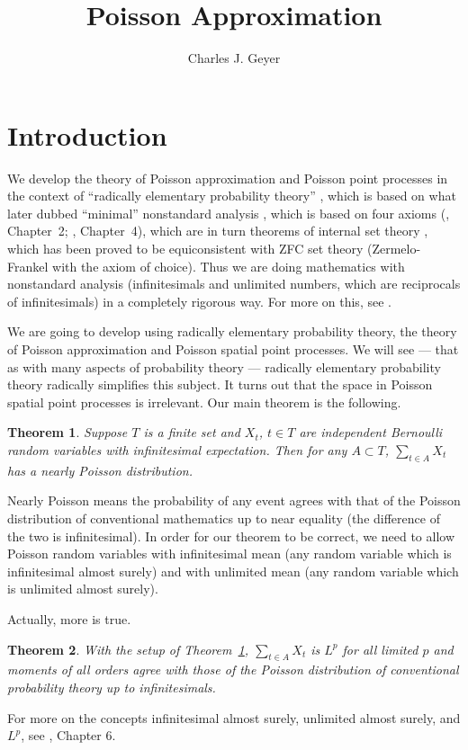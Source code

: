 \documentclass[11pt]{article}
\newtheorem{theorem}{Theorem}
\begin{document}
\title{Poisson Approximation}

\author{Charles J. Geyer}

\maketitle

\section{Introduction}

We develop the theory of Poisson approximation and Poisson point processes
in the context of ``radically elementary probability theory'' \citep{nelson},
which is based on what \citeauthor{nelson} later dubbed ``minimal'' nonstandard
analysis \citep{nelson-minimal}, which is based on four axioms
(\citealp{geyer}, Chapter~2; \citet{nelson}, Chapter~4), which are in turn
theorems of internal set theory \citep{nelson-bull}, which has been proved
to be equiconsistent with ZFC set theory (Zermelo-Frankel with the axiom of
choice).  Thus we are doing mathematics with nonstandard analysis
(infinitesimals and unlimited numbers, which are reciprocals of infinitesimals)
in a completely rigorous way.  For more on this, see \citet[Chapter~2]{geyer}.

We are going to develop using radically elementary probability theory,
the theory of Poisson approximation and Poisson spatial point processes.
We will see --- that as with many aspects of probability theory --- radically
elementary probability theory radically simplifies this subject.  It turns
out that the space in Poisson spatial point processes is irrelevant.
Our main theorem is the following.
\begin{theorem} \label{th:main}
Suppose $T$ is a finite set and $X_t$, $t \in T$ are independent Bernoulli
random variables with infinitesimal expectation.  Then for any $A \subset T$,
$\sum_{t \in A} X_t$ has a nearly Poisson distribution.
\end{theorem}
Nearly Poisson means the probability of any event agrees with that of the
Poisson distribution of conventional mathematics up to near equality
(the difference of the two is infinitesimal).  In order for our theorem
to be correct, we need to allow Poisson random variables with infinitesimal
mean (any random variable which is infinitesimal almost surely) and with
unlimited mean (any random variable which is unlimited almost surely).

Actually, more is true.
\begin{theorem} \label{th:l-p}
With the setup of Theorem~\ref{th:main},
$\sum_{t \in A} X_t$ is $L^p$ for all limited $p$ and moments of all orders
agree with those of the Poisson distribution of conventional probability
theory up to infinitesimals.
\end{theorem}
For more on the concepts infinitesimal almost surely, unlimited almost surely,
and $L^p$, see \citet{geyer}, Chapter 6.
\end{document}
